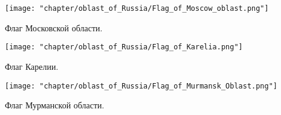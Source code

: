 \begin{marginfigure}[0.0cm]
\centering\texttt{[image: "chapter/oblast\_of\_Russia/Flag\_of\_Moscow\_oblast.png"]}
\caption [Флаг Московской области.]{Флаг Московской области.}%
\label{fig:Flag_of_Moscow_oblast}%
\end{marginfigure}

\begin{marginfigure}[0.0cm]
\centering\texttt{[image: "chapter/oblast\_of\_Russia/Flag\_of\_Karelia.png"]}
\caption [Флаг Карелии.]{Флаг Карелии.}%
\label{fig:Flag_of_Karelia}%
\end{marginfigure}

\begin{marginfigure}[0.0cm]
\centering\texttt{[image: "chapter/oblast\_of\_Russia/Flag\_of\_Murmansk\_Oblast.png"]}
\caption [Флаг Мурманской области.]{Флаг Мурманской области.}%
\label{fig:Flag_of_Murmansk_Oblast}%
\end{marginfigure}



